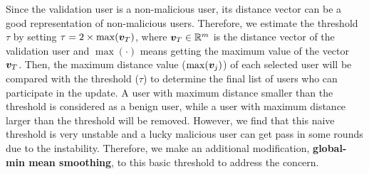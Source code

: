 \documentclass{article} %
\newcommand{\yli}[1]{{\color{cyan}#1}}
\begin{document}
\yli{Since the validation user is a non-malicious user, its distance vector can be a good representation of non-malicious users. Therefore, we estimate the threshold $\tau$ by setting $\tau=2\times\max({\bm{v}}_T)$, where ${\bm{v}}_T\in{\mathbb{R}}^m$ is the distance vector of the validation user and $\max(\cdot)$ means getting the maximum value of the vector ${\bm{v}}_T$. Then, the maximum distance value ($\max({\bm{v}}_j)$) of each selected user will be compared with the threshold ($\tau$) to determine the final list of users who can participate in the update. A user with maximum distance smaller than the threshold is considered as a benign user, while a user with maximum distance larger than the threshold will be removed.}
However, we find that this naive threshold is very unstable and a lucky malicious user can get pass in some rounds due to the instability. Therefore, we make an additional modification, {\bf global-min mean smoothing}, to this basic threshold to address the concern.





\vspace{-10pt}
\end{document}
